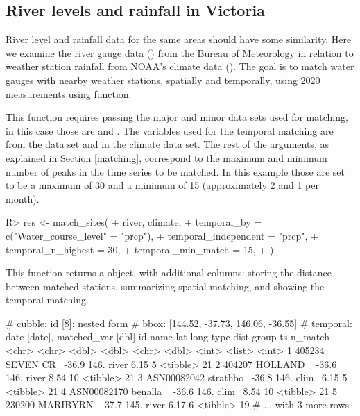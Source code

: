 \documentclass[
  shortnames]{jss}
\begin{document}
\hypertarget{river-levels-and-rainfall-in-victoria}{%
\subsection{River levels and rainfall in Victoria}\label{river-levels-and-rainfall-in-victoria}}

River level and rainfall data for the same areas should have some similarity. Here we examine the river gauge data () from the Bureau of Meteorology \citep{bom} in relation to weather station rainfall from NOAA's climate data (). The goal is to match water gauges with nearby weather stations, spatially and temporally, using 2020 measurements using  function.

This function requires passing the major and minor data sets used for matching, in this case those are  and . The variables used for the temporal matching are  from the  data set and  in the climate data set. The rest of the arguments, as explained in Section \ref{matching}, correspond to the maximum and minimum number of peaks in the time series to be matched. In this example those are set to be a maximum of 30 and a minimum of 15 (approximately 2 and 1 per month).

\begin{CodeChunk}
\begin{CodeInput}
R> res <- match_sites(
+   river, climate,
+   temporal_by = c("Water_course_level" = "prcp"),
+   temporal_independent = "prcp",  
+   temporal_n_highest = 30,
+   temporal_min_match = 15, 
+ )
\end{CodeInput}
\end{CodeChunk}

This function returns a  object, with additional columns:  storing the distance between matched stations,  summarizing spatial matching, and  showing the temporal matching.

\begin{CodeChunk}
\begin{CodeOutput}
# cubble:   id [8]: nested form
# bbox:     [144.52, -37.73, 146.06, -36.55]
# temporal: date [date], matched_var [dbl]
  id          name        lat  long type   dist group ts       n_match
  <chr>       <chr>     <dbl> <dbl> <chr> <dbl> <int> <list>     <int>
1 405234      SEVEN CR~ -36.9  146. river  6.15     5 <tibble>      21
2 404207      HOLLAND ~ -36.6  146. river  8.54    10 <tibble>      21
3 ASN00082042 strathbo~ -36.8  146. clim~  6.15     5 <tibble>      21
4 ASN00082170 benalla ~ -36.6  146. clim~  8.54    10 <tibble>      21
5 230200      MARIBYRN~ -37.7  145. river  6.17     6 <tibble>      19
# ... with 3 more rows
\end{CodeOutput}
\end{CodeChunk}
\end{document}
